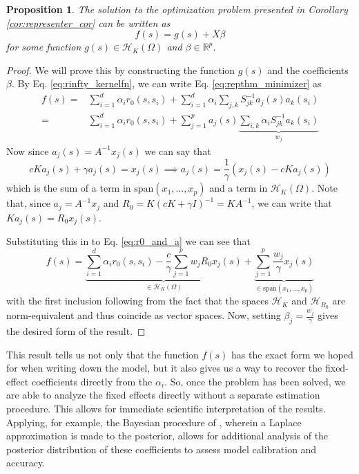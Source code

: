 \documentclass[ejsv2,preprint]{imsart}
\newtheorem{prop}{Proposition}[section]
\newcommand{\SPAN}[1]{\text{span}\left(#1\right)}
\begin{document}
\begin{prop}
    The solution to the optimization problem presented in Corollary \ref{cor:representer_cor} can be written as
    \begin{equation}
        f(s) = g(s)+X\beta
    \end{equation}
    for some function $g(s)\in \mathcal{H}_K(\Omega)$ and $\beta\in \mathbb{R}^p$.
\end{prop}
\begin{proof}
    We will prove this by constructing the function $g(s)$ and the coefficients $\beta$. By Eq. \eqref{eq:rinfty_kernelfn}, we can write Eq. \eqref{eq:repthm_minimizer} as
    \begin{equation}\label{eq:r0_and_a}
    \begin{split}
        f(s) =& \sum_{i=1}^d\alpha_ir_0(s,s_i) + \sum_{i=1}^d\alpha_i\sum_{j,k}S^{-1}_{jk}a_j(s)a_k(s_i)\\
        =&\sum_{i=1}^d\alpha_ir_0(s,s_i) + \sum_{j=1}^p a_j(s)\underbrace{\sum_{i,k}\alpha_iS_{jk}^{-1}a_k(s_i)}_{w_j}
        \end{split}
    \end{equation}
    Now since $a_j(s)=A^{-1}x_j(s)$ we can say that 
    \begin{equation}
        cKa_j(s)+\gamma a_j(s) = x_j(s) \implies  a_j(s) = \frac{1}{\gamma}\left(x_j(s)-cKa_j(s)\right)
    \end{equation}
    which is the sum of a term in $\SPAN{x_1,...,x_p}$ and a term in $\mathcal{H}_K(\Omega)$. Note that, since $a_j=A^{-1}x_j$ and $R_0=K(cK+\gamma I)^{-1}=KA^{-1}$, we can write that $Ka_j(s)=R_0x_j(s)$.
    
    Substituting this in to Eq. \eqref{eq:r0_and_a} we can see that
    \begin{equation}
        f(s) = \underbrace{\sum_{i=1}^d\alpha_ir_0(s,s_i) -\frac{c}{\gamma}\sum_{j=1}^pw_jR_0 x_j(s)}_{\in \mathcal{H}_K(\Omega)}+\underbrace{\sum_{j=1}^p \frac{w_j}{\gamma}x_j(s)}_{\in\SPAN{x_1,...,x_p}}
    \end{equation}
    with the first inclusion following from the fact that the spaces $\mathcal{H}_K$ and $\mathcal{H}_{R_0}$ are norm-equivalent and thus coincide as vector spaces. Now, setting $\beta_j=\frac{w_j}{\gamma}$ gives the desired form of the result.
\end{proof}
This result tells us not only that the function $f(s)$ has the exact form we hoped for when writing down the model, but it also gives us a way to recover the fixed-effect coefficients directly from the $\alpha_i$. So, once the problem has been solved, we are able to analyze the fixed effects directly without a separate estimation procedure. This allows for immediate scientific interpretation of the results. Applying, for example, the Bayesian procedure of \cite{pmlr-v70-walder17a}, wherein a Laplace approximation is made to the posterior, allows for additional analysis of the posterior distribution of these coefficients to assess model calibration and accuracy.  
\end{document}
